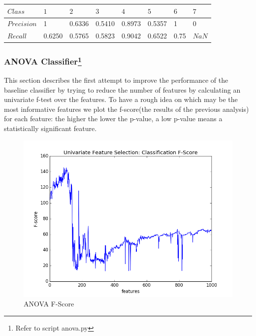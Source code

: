 \documentclass[a4paper,10pt]{article}
\begin{document}
      \begin{table}[H]
      	\centering
	\begin{tabular}{l|P{1cm}P{1cm}P{1cm}P{1cm}P{1cm}P{1cm}P{1cm}} \toprule
	  {$Class$} & {$1$} & {$2$} & {$3$} & {$4$} & {$5$} & {$6$} & {$7$} \\ \midrule
	  $Precision$  & 1 & 0.6336 & 0.5410 & 0.8973 & 0.5357 & 1 & 0 \\ \midrule
	  $Recall$  & 0.6250 & 0.5765 & 0.5823 & 0.9042 & 0.6522 & 0.75  & $NaN$  \\ \bottomrule
	\end{tabular}
      \end{table}
    
    \subsubsection{ANOVA Classifier\protect\footnote{Refer to script anova.py}}
      This section describes the first attempt to improve the performance of the baseline classifier by trying to reduce the number of
      features by calculating an univariate f-test over the features.\newline
      To have a rough idea on which may be the most informative features we plot the f-score(the results of the previous analysis) for each 
      feature: the higher the lower the p-value, a low p-value means a statistically significant feature.
      \begin{figure}[H]
	\centering
	\includegraphics[scale=0.5]{anova_f_score.png}
	\caption{ANOVA F-Score}
      \end{figure}
      
\end{document}
